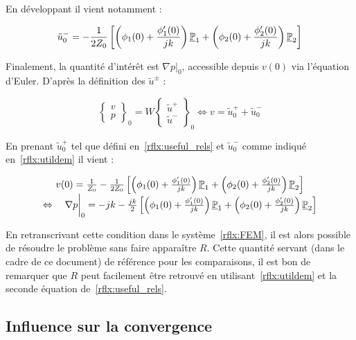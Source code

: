 En développant il vient notamment :

\begin{equation}
	\tilde{u}^-_0 = -\frac{1}{2Z_0}\left[\left(\phi_1(0) + \frac{\phi'_1(0)}{jk}\right)\underline{\mathbb{P}}_1 + \left(\phi_2(0) + \frac{\phi'_2(0)}{jk}\right)\underline{\mathbb{P}}_2 \right]\label{rflx:utildem}
\end{equation}

Finalement, la quantité d'intérêt est $\nabla p\big|_0$, accessible depuis $v(0)$ via l'équation d'Euler. D'après la
définition des $\tilde{u}^\pm$ :


\begin{equation*}
\begin{Bmatrix}
	v\\p
\end{Bmatrix}_0
= W\begin{Bmatrix}
	\tilde{u}^+\\\tilde{u}^-
\end{Bmatrix}_0 \Leftrightarrow
v = \tilde{u}^+_0 + \tilde{u}^-_0
\end{equation*}

En prenant $\tilde{u}^+_0$ tel que défini en~\eqref{rflx:useful_rels} et $\tilde{u}^-_0$ comme indiqué
en~\eqref{rflx:utildem} il vient :

\begin{equation*}
	\begin{array}{c}
	v(0) = \frac{1}{Z_0} -\frac{1}{2Z_0}\left[\left(\phi_1(0) + \frac{\phi'_1(0)}{jk}\right)\underline{\mathbb{P}}_1 + \left(\phi_2(0) + \frac{\phi'_2(0)}{jk}\right)\underline{\mathbb{P}}_2 \right]\\
	\Leftrightarrow\quad \nabla p\bigg|_0 = - jk -\frac{jk}{2}\left[\left(\phi_1(0) + \frac{\phi'_1(0)}{jk}\right)\underline{\mathbb{P}}_1 + \left(\phi_2(0) + \frac{\phi'_2(0)}{jk}\right)\underline{\mathbb{P}}_2 \right]
	\end{array}
\end{equation*}


En retranscrivant cette condition dans le système~\eqref{rflx:FEM}, il est alors possible de résoudre le problème sans
faire apparaître $R$. Cette quantité servant (dans le cadre de ce document) de référence pour les comparaisons, il est
bon de remarquer que $R$ peut facilement être retrouvé en utilisant~\eqref{rflx:utildem} et la seconde équation
de~\eqref{rflx:useful_rels}.

\subsection{Influence sur la convergence}

